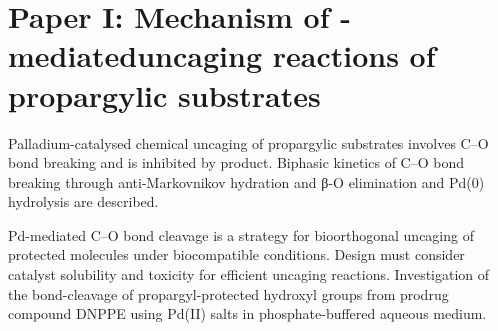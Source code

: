 \chapter{Paper I:\@
  Mechanism of -mediated\linebreak uncaging reactions %
  of propargylic substrates
 }%
\label{ch:paper1}



Palladium-catalysed chemical uncaging of propargylic substrates involves C–O bond breaking and is inhibited by product.
Biphasic kinetics of C–O bond breaking through anti-Markovnikov hydration and β-O elimination and Pd(0) hydrolysis are described.

Pd-mediated C–O bond cleavage is a strategy for bioorthogonal uncaging of protected molecules under biocompatible conditions.
Design must consider catalyst solubility and toxicity for efficient uncaging reactions.
Investigation of the bond-cleavage of propargyl-protected hydroxyl groups from prodrug compound DNPPE using Pd(II) salts in phosphate-buffered aqueous medium.

